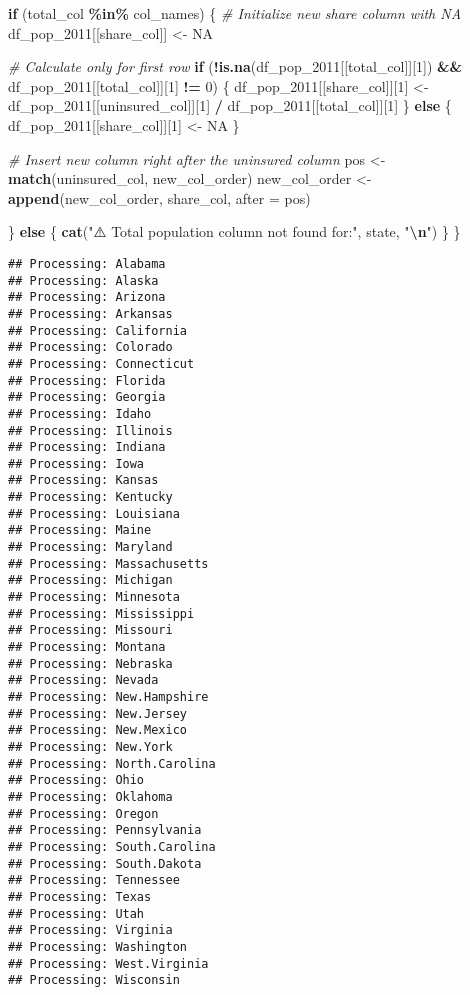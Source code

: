 \documentclass[
]{article}
\newenvironment{Shaded}{\begin{snugshade}}{\end{snugshade}}
\newcommand{\AttributeTok}[1]{\textcolor[rgb]{0.13,0.29,0.53}{#1}}
\newcommand{\CommentTok}[1]{\textcolor[rgb]{0.56,0.35,0.01}{\textit{#1}}}
\newcommand{\ConstantTok}[1]{\textcolor[rgb]{0.56,0.35,0.01}{#1}}
\newcommand{\ControlFlowTok}[1]{\textcolor[rgb]{0.13,0.29,0.53}{\textbf{#1}}}
\newcommand{\DecValTok}[1]{\textcolor[rgb]{0.00,0.00,0.81}{#1}}
\newcommand{\FunctionTok}[1]{\textcolor[rgb]{0.13,0.29,0.53}{\textbf{#1}}}
\newcommand{\NormalTok}[1]{#1}
\newcommand{\OtherTok}[1]{\textcolor[rgb]{0.56,0.35,0.01}{#1}}
\newcommand{\SpecialCharTok}[1]{\textcolor[rgb]{0.81,0.36,0.00}{\textbf{#1}}}
\newcommand{\StringTok}[1]{\textcolor[rgb]{0.31,0.60,0.02}{#1}}
\begin{document}
\begin{Shaded}
\begin{Highlighting}[]
  \ControlFlowTok{if}\NormalTok{ (total\_col }\SpecialCharTok{\%in\%}\NormalTok{ col\_names) \{}
    \CommentTok{\# Initialize new share column with NA}
\NormalTok{    df\_pop\_2011[[share\_col]] }\OtherTok{\textless{}{-}} \ConstantTok{NA}
    
    \CommentTok{\# Calculate only for first row}
    \ControlFlowTok{if}\NormalTok{ (}\SpecialCharTok{!}\FunctionTok{is.na}\NormalTok{(df\_pop\_2011[[total\_col]][}\DecValTok{1}\NormalTok{]) }\SpecialCharTok{\&\&}\NormalTok{ df\_pop\_2011[[total\_col]][}\DecValTok{1}\NormalTok{] }\SpecialCharTok{!=} \DecValTok{0}\NormalTok{) \{}
\NormalTok{      df\_pop\_2011[[share\_col]][}\DecValTok{1}\NormalTok{] }\OtherTok{\textless{}{-}}\NormalTok{ df\_pop\_2011[[uninsured\_col]][}\DecValTok{1}\NormalTok{] }\SpecialCharTok{/}\NormalTok{ df\_pop\_2011[[total\_col]][}\DecValTok{1}\NormalTok{]}
\NormalTok{    \} }\ControlFlowTok{else}\NormalTok{ \{}
\NormalTok{      df\_pop\_2011[[share\_col]][}\DecValTok{1}\NormalTok{] }\OtherTok{\textless{}{-}} \ConstantTok{NA}
\NormalTok{    \}}
    
    \CommentTok{\# Insert new column right after the uninsured column}
\NormalTok{    pos }\OtherTok{\textless{}{-}} \FunctionTok{match}\NormalTok{(uninsured\_col, new\_col\_order)}
\NormalTok{    new\_col\_order }\OtherTok{\textless{}{-}} \FunctionTok{append}\NormalTok{(new\_col\_order, share\_col, }\AttributeTok{after =}\NormalTok{ pos)}
    
\NormalTok{  \} }\ControlFlowTok{else}\NormalTok{ \{}
    \FunctionTok{cat}\NormalTok{(}\StringTok{"⚠️ Total population column not found for:"}\NormalTok{, state, }\StringTok{"}\SpecialCharTok{\textbackslash{}n}\StringTok{"}\NormalTok{)}
\NormalTok{  \}}
\NormalTok{\}}
\end{Highlighting}
\end{Shaded}

\begin{verbatim}
## Processing: Alabama 
## Processing: Alaska 
## Processing: Arizona 
## Processing: Arkansas 
## Processing: California 
## Processing: Colorado 
## Processing: Connecticut 
## Processing: Florida 
## Processing: Georgia 
## Processing: Idaho 
## Processing: Illinois 
## Processing: Indiana 
## Processing: Iowa 
## Processing: Kansas 
## Processing: Kentucky 
## Processing: Louisiana 
## Processing: Maine 
## Processing: Maryland 
## Processing: Massachusetts 
## Processing: Michigan 
## Processing: Minnesota 
## Processing: Mississippi 
## Processing: Missouri 
## Processing: Montana 
## Processing: Nebraska 
## Processing: Nevada 
## Processing: New.Hampshire 
## Processing: New.Jersey 
## Processing: New.Mexico 
## Processing: New.York 
## Processing: North.Carolina 
## Processing: Ohio 
## Processing: Oklahoma 
## Processing: Oregon 
## Processing: Pennsylvania 
## Processing: South.Carolina 
## Processing: South.Dakota 
## Processing: Tennessee 
## Processing: Texas 
## Processing: Utah 
## Processing: Virginia 
## Processing: Washington 
## Processing: West.Virginia 
## Processing: Wisconsin
\end{verbatim}
\end{document}
